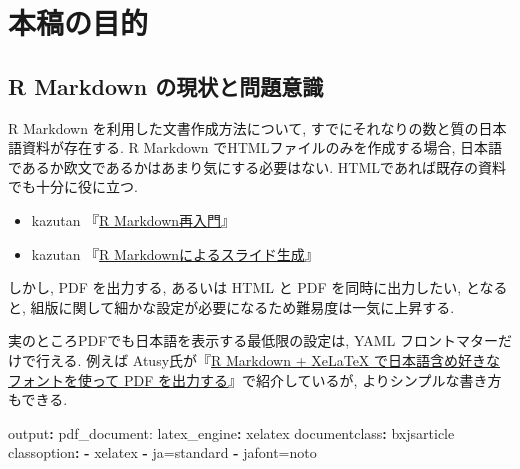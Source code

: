 \documentclass[
  xelatex,ja=standard,jafont=noto]{bxjsbook}
\newenvironment{Shaded}{\begin{snugshade}}{\end{snugshade}}
\newcommand{\AttributeTok}[1]{\textcolor[rgb]{0.77,0.63,0.00}{#1}}
\newcommand{\FunctionTok}[1]{\textcolor[rgb]{0.00,0.00,0.00}{#1}}
\newcommand{\KeywordTok}[1]{\textcolor[rgb]{0.13,0.29,0.53}{\textbf{#1}}}
\providecommand{\tightlist}{%
  \setlength{\itemsep}{0pt}\setlength{\parskip}{0pt}}
\theoremstyle{definition}
\theoremstyle{definition}
\theoremstyle{definition}
\theoremstyle{definition}
\theoremstyle{remark}
\begin{document}
\hypertarget{ux672cux7a3fux306eux76eeux7684}{%
\chapter*{本稿の目的}\label{ux672cux7a3fux306eux76eeux7684}}

\hypertarget{r-markdown-ux306eux73feux72b6ux3068ux554fux984cux610fux8b58}{%
\section*{R Markdown
の現状と問題意識}\label{r-markdown-ux306eux73feux72b6ux3068ux554fux984cux610fux8b58}}

R Markdown を利用した文書作成方法について,
すでにそれなりの数と質の日本語資料が存在する. R Markdown
でHTMLファイルのみを作成する場合,
日本語であるか欧文であるかはあまり気にする必要はない.
HTMLであれば既存の資料でも十分に役に立つ.

\begin{itemize}
\tightlist
\item
  kazutan
  『\href{https://kazutan.github.io/fukuokaR11/intro_rmarkdown_d.html}{R
  Markdown再入門}』
\item
  kazutan
  『\href{https://kazutan.github.io/SappoRoR6/rmd_slide.html\#/}{R
  Markdownによるスライド生成}』
\end{itemize}

しかし, PDF を出力する, あるいは HTML と PDF を同時に出力したい,
となると, 組版に関して細かな設定が必要になるため難易度は一気に上昇する.

実のところPDFでも日本語を表示する最低限の設定は, YAML
フロントマターだけで行える. 例えば
Atusy氏が『\href{https://blog.atusy.net/2019/05/14/rmd2pdf-any-font/}{R
Markdown + XeLaTeX で日本語含め好きなフォントを使って PDF
を出力する}』で紹介しているが, よりシンプルな書き方もできる.

\begin{Shaded}
\begin{Highlighting}[]
\FunctionTok{output}\KeywordTok{:}\AttributeTok{ pdf\_document:}
\AttributeTok{    }\FunctionTok{latex\_engine}\KeywordTok{:}\AttributeTok{ xelatex}
\FunctionTok{documentclass}\KeywordTok{:}\AttributeTok{ bxjsarticle}
\FunctionTok{classoption}\KeywordTok{:}
\AttributeTok{  }\KeywordTok{{-}}\AttributeTok{ xelatex}
\AttributeTok{  }\KeywordTok{{-}}\AttributeTok{ ja=standard}
\AttributeTok{  }\KeywordTok{{-}}\AttributeTok{ jafont=noto}
\end{Highlighting}
\end{Shaded}
\end{document}

